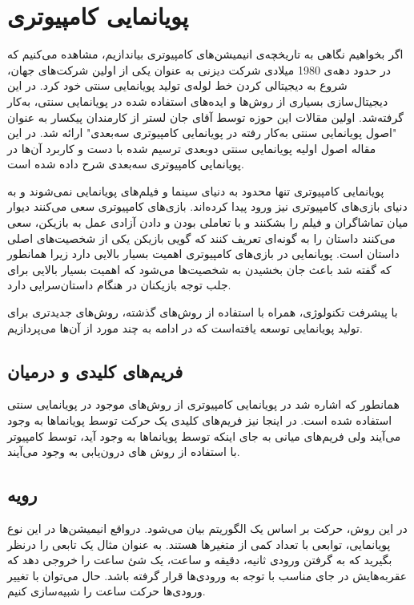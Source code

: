 \section{پویانمایی کامپیوتری}

اگر بخواهیم نگاهی به تاریخچه‌ی انیمیشن‌های کامپیوتری بیاندازیم، مشاهده می‌کنیم که 
در حدود دهه‌ی 1980 میلادی شرکت دیزنی به عنوان یکی از اولین شرکت‌های جهان، شروع به 
دیجیتالی کردن خط لوله‌ی تولید پویانمایی سنتی خود کرد.
در این دیجیتال‌سازی بسیاری از روش‌ها و ایده‌‌های استفاده شده در پویانمایی سنتی،
به‌کار گرفته‌شد.
اولین مقالات این حوزه توسط آقای جان لستر از کارمندان پیکسار به عنوان 
"اصول پویانمایی سنتی به‌کار رفته در پویانمایی کامپیوتری سه‌بعدی"
ارائه شد.
در این مقاله اصول اولیه پویانمایی سنتی دوبعدی ترسیم شده با دست
و کاربرد آن‌ها در پویانمایی کامپیوتری سه‌بعدی شرح داده شده است.

پویانمایی کامپیوتری تنها محدود به دنیای سینما و فیلم‌های پویانمایی نمی‌شوند و به دنیای
بازی‌های کامپیوتری نیز ورود پیدا کرده‌اند. بازی‌های کامپیوتری سعی می‌کنند دیوار میان تماشاگران و فیلم را بشکنند و 
با تعاملی بودن و دادن آزادی عمل به بازیکن، سعی می‌کنند داستان را به گونه‌ای تعریف کنند که گویی بازیکن یکی از شخصیت‌های اصلی داستان است.
پویانمایی در بازی‌های کامپیوتری اهمیت بسیار بالایی دارد زیرا همانطور که گفته شد باعث 
جان بخشیدن به شخصیت‌ها می‌شود که اهمیت بسیار بالایی برای جلب توجه بازیکنان در هنگام داستان‌سرایی دارد.

با پیشرفت تکنولوژی، همراه با استفاده از روش‌های گذشته، روش‌های جدیدتری برای تولید پویانمایی توسعه یافته‌است که 
در ادامه به چند مورد از آن‌‌ها می‌پردازیم.

\subsection{فریم‌های کلیدی و درمیان}

همانطور که اشاره شد در پویانمایی کامپیوتری از روش‌های موجود در 
پویانمایی سنتی استفاده شده است. در اینجا نیز فریم‌های کلیدی 
یک حرکت توسط پویانماها به وجود می‌‌آیند ولی فریم‌های میانی به جای اینکه توسط پویانماها به وجود آید،
توسط کامپیوتر با استفاده از روش های درون‌یابی به وجود می‌آیند.

\subsection{رویه}

در این روش، حرکت بر اساس یک الگوریتم بیان می‌شود.
درواقع انیمیشن‌ها در این نوع پویانمایی، توابعی با تعداد کمی از متغیر‌ها هستند.
به عنوان مثال یک تابعی را درنظر بگیرید که به گرفتن ورودی ثانیه، دقیقه و ساعت، 
یک شئ ساعت را خروجی دهد که عقربه‌هایش در جای مناسب با توجه به ورودی‌ها قرار گرفته باشد.
حال می‌توان با تغییر ورودی‌ها حرکت ساعت را شبیه‌سازی کنیم.

